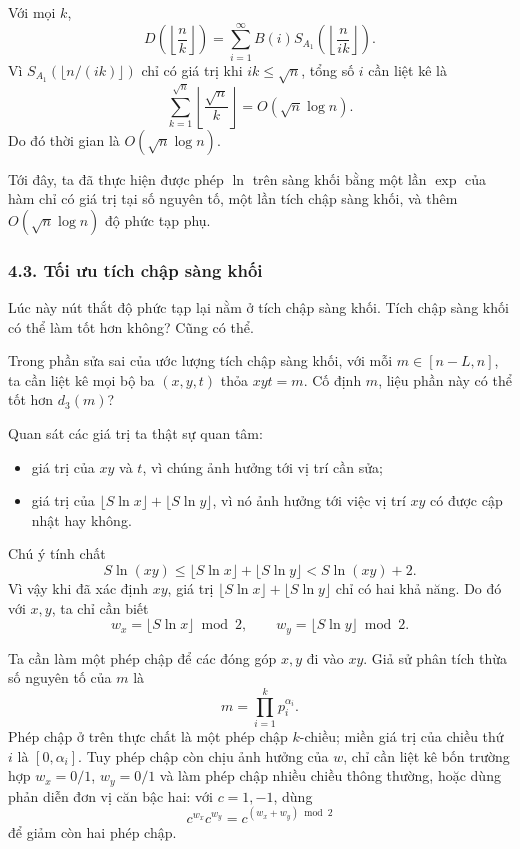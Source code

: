 \documentclass[11pt]{article}
\begin{document}
Với mọi \(k\),
\[
  D\left(\left\lfloor\frac{n}{k}\right\rfloor\right)
  =
  \sum_{i=1}^{\infty} B(i)
  S_{A_1}\left(\left\lfloor\frac{n}{ik}\right\rfloor\right).
\]
Vì \(S_{A_1}(\lfloor n/(ik)\rfloor)\) chỉ có giá trị khi
\(ik\le\sqrt n\), tổng số \(i\) cần liệt kê là
\[
  \sum_{k=1}^{\sqrt n}\left\lfloor\frac{\sqrt n}{k}\right\rfloor
  =
  O(\sqrt n\log n).
\]
Do đó thời gian là \(O(\sqrt n\log n)\).

Tới đây, ta đã thực hiện được phép \(\ln\) trên sàng khối bằng một lần
\(\exp\) của hàm chỉ có giá trị tại số nguyên tố, một lần tích chập sàng khối,
và thêm \(O(\sqrt n\log n)\) độ phức tạp phụ.

\subsubsection*{4.3. Tối ưu tích chập sàng khối}

Lúc này nút thắt độ phức tạp lại nằm ở tích chập sàng khối. Tích chập sàng
khối có thể làm tốt hơn không? Cũng có thể.

Trong phần sửa sai của ước lượng tích chập sàng khối, với mỗi
\(m\in[n-L,n]\), ta cần liệt kê mọi bộ ba \((x,y,t)\) thỏa \(xyt=m\). Cố định
\(m\), liệu phần này có thể tốt hơn \(d_3(m)\)?

Quan sát các giá trị ta thật sự quan tâm:
\begin{itemize}
  \item giá trị của \(xy\) và \(t\), vì chúng ảnh hưởng tới vị trí cần sửa;
  \item giá trị của \(\lfloor S\ln x\rfloor+\lfloor S\ln y\rfloor\), vì nó
  ảnh hưởng tới việc vị trí \(xy\) có được cập nhật hay không.
\end{itemize}

Chú ý tính chất
\[
  S\ln(xy)\le
  \lfloor S\ln x\rfloor+\lfloor S\ln y\rfloor
  < S\ln(xy)+2.
\]
Vì vậy khi đã xác định \(xy\), giá trị
\(\lfloor S\ln x\rfloor+\lfloor S\ln y\rfloor\) chỉ có hai khả năng. Do đó với
\(x,y\), ta chỉ cần biết
\[
  w_x=\lfloor S\ln x\rfloor\bmod 2,\qquad
  w_y=\lfloor S\ln y\rfloor\bmod 2.
\]

Ta cần làm một phép chập để các đóng góp \(x,y\) đi vào \(xy\). Giả sử phân
tích thừa số nguyên tố của \(m\) là
\[
  m=\prod_{i=1}^{k}p_i^{\alpha_i}.
\]
Phép chập ở trên thực chất là một phép chập \(k\)-chiều; miền giá trị của chiều
thứ \(i\) là \([0,\alpha_i]\). Tuy phép chập còn chịu ảnh hưởng của \(w\), chỉ
cần liệt kê bốn trường hợp \(w_x=0/1\), \(w_y=0/1\) và làm phép chập nhiều
chiều thông thường, hoặc dùng phản diễn đơn vị căn bậc hai: với
\(c=1,-1\), dùng
\[
  c^{w_x}c^{w_y}=c^{(w_x+w_y)\bmod 2}
\]
để giảm còn hai phép chập.
\end{document}
